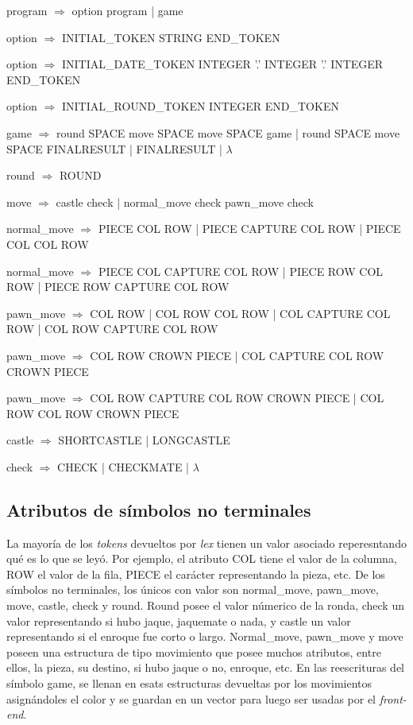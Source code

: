 \documentclass[a4paper,10pt]{article}
\begin{document}
program $\Rightarrow$ option program | game 

option $\Rightarrow$ INITIAL_TOKEN STRING END_TOKEN  

option $\Rightarrow$ INITIAL_DATE_TOKEN INTEGER '.' INTEGER '.' INTEGER END_TOKEN 

option $\Rightarrow$ INITIAL_ROUND_TOKEN INTEGER END_TOKEN 

game $\Rightarrow$ round SPACE move SPACE move SPACE game | round SPACE move SPACE FINALRESULT | FINALRESULT | $\lambda$

round $\Rightarrow$ ROUND               

move $\Rightarrow$  castle check | normal_move check pawn_move   check 

normal_move $\Rightarrow$ PIECE COL ROW | PIECE CAPTURE COL ROW | PIECE COL COL ROW         

normal_move $\Rightarrow$ PIECE COL CAPTURE COL ROW | PIECE ROW COL ROW | PIECE ROW CAPTURE COL ROW 

pawn_move $\Rightarrow$ COL ROW | COL ROW COL ROW | COL CAPTURE COL ROW  | COL ROW CAPTURE COL ROW      
       
pawn_move $\Rightarrow$ COL ROW CROWN PIECE | COL CAPTURE COL ROW CROWN PIECE     

pawn_move $\Rightarrow$ COL ROW CAPTURE COL ROW CROWN PIECE | COL ROW COL ROW CROWN PIECE         

castle $\Rightarrow$ SHORTCASTLE   | LONGCASTLE   

check $\Rightarrow$ CHECK  | CHECKMATE  | $\lambda$

\subsection{Atributos de símbolos no terminales }

La mayoría de los \textit{tokens} devueltos por \textit{lex} tienen un valor asociado reperesntando qué es lo que se leyó. Por ejemplo, 
el atributo COL tiene el valor de la columna, ROW el valor de la fila, PIECE el carácter representando la pieza, etc.
De los símbolos no terminales, los únicos con valor son normal_move, pawn_move, move, castle, check y round. Round posee el valor númerico de la ronda, 
check un valor representando si hubo jaque, jaquemate o nada, y castle un valor representando si el enroque fue corto o largo. Normal_move, pawn_move 
y move poseen una estructura de tipo movimiento que posee muchos atributos, entre ellos, la pieza, su destino, si hubo jaque o no, enroque, etc. En las 
reescrituras del símbolo game, se llenan en esats estructuras devueltas por los movimientos asignándoles el color y se guardan en un vector para luego 
ser usadas por el \textit{front-end}.
\end{document}
